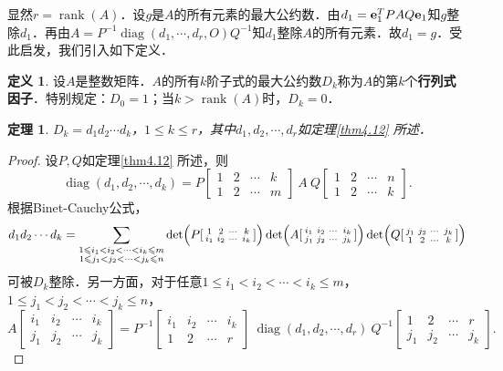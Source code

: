 \documentclass[a4paper,fontset=windows]{ctexbook}
\newtheorem{theorem}{定理}[chapter]
\theoremstyle{definition}
\newtheorem{definition}{定义}[chapter]
\DeclareMathOperator{\diag}{diag}
\DeclareMathOperator{\rank}{rank}
\renewcommand{\le}{\leqslant}
\begin{document}
\medskip 显然$r=\rank(A)$．设$g$是$A$的所有元素的最大公约数．由$d_1={\bf e}_1^TPAQ{\bf e}_1$知$g$整除$d_1$．再由$A=P^{-1}\diag(d_1,\cdots,d_r,O)Q^{-1}$知$d_1$整除$A$的所有元素．故$d_1=g$．受此启发，我们引入如下定义．

\begin{definition}
设$A$是整数矩阵．$A$的所有$k$阶子式的最大公约数$D_k$称为$A$的第$k$个{\bf 行列式因子}．特别规定：$D_0=1$；当$k>\rank(A)$时，$D_k=0$．
\end{definition}

\begin{theorem}\label{thm4.13}
$D_k=d_1d_2\cdots d_k$，$1\le k\le r$，其中$d_1,d_2,\cdots,d_r$如定理\ref{thm4.12} 所述．
\end{theorem}

\begin{proof}
设$P,Q$如定理\ref{thm4.12} 所述，则
$$\diag(d_1,d_2,\cdots,d_k)=P[\begin{smallmatrix}1&2&\cdots&k \\ 1&2&\cdots&m\end{smallmatrix}]~A~Q[\begin{smallmatrix}1&2&\cdots&n \\ 1&2&\cdots&k\end{smallmatrix}].$$
根据Binet-Cauchy公式，
$$d_1d_2\cdots d_k=\sum_{\substack{1\le i_1<i_2<\cdots<i_k\le m\\ 1\le j_1<j_2<\cdots<j_k\le n}}\det\Bigl(P[\begin{smallmatrix}1&2&\cdots&k \\ i_1&i_2&\cdots&i_k\end{smallmatrix}]\Bigr)\det\Bigl(A[\begin{smallmatrix}i_1&i_2&\cdots&i_k \\ j_1&j_2&\cdots&j_k\end{smallmatrix}]\Bigr)\det\Bigl(Q[\begin{smallmatrix}j_1&j_2&\cdots&j_k \\ 1&2&\cdots&k\end{smallmatrix}]\Bigr)$$
可被$D_k$整除．另一方面，对于任意$1\le i_1<i_2<\cdots<i_k\le m$，$1\le j_1<j_2<\cdots<j_k\le n$，
$$A[\begin{smallmatrix}i_1&i_2&\cdots&i_k \\ j_1&j_2&\cdots&j_k\end{smallmatrix}]=P^{-1}[\begin{smallmatrix}i_1&i_2&\cdots&i_k \\ 1&2&\cdots&r\end{smallmatrix}]~\diag(d_1,d_2,\cdots,d_r)~Q^{-1}[\begin{smallmatrix}1&2&\cdots&r \\ j_1&j_2&\cdots&j_k\end{smallmatrix}].$$

\end{proof}
\end{document}
